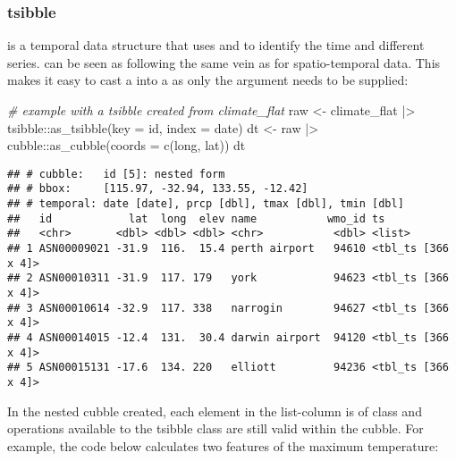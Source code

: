 \documentclass{article}
\newenvironment{Shaded}{\begin{snugshade}}{\end{snugshade}}
\newcommand{\AttributeTok}[1]{\textcolor[rgb]{0.77,0.63,0.00}{#1}}
\newcommand{\CommentTok}[1]{\textcolor[rgb]{0.56,0.35,0.01}{\textit{#1}}}
\newcommand{\FunctionTok}[1]{\textcolor[rgb]{0.00,0.00,0.00}{#1}}
\newcommand{\NormalTok}[1]{#1}
\newcommand{\OtherTok}[1]{\textcolor[rgb]{0.56,0.35,0.01}{#1}}
\newcommand{\SpecialCharTok}[1]{\textcolor[rgb]{0.00,0.00,0.00}{#1}}
\begin{document}
\hypertarget{tsibble}{%
\subsubsection{tsibble}\label{tsibble}}

 is a temporal data structure that uses  and  to identify the time and different series.  can be seen as following the same vein as  for spatio-temporal data. This makes it easy to cast a  into a  as only the  argument needs to be supplied:

\begin{Shaded}
\begin{Highlighting}[]
\CommentTok{\# example with a tsibble created from climate\_flat}
\NormalTok{raw }\OtherTok{\textless{}{-}}\NormalTok{ climate\_flat }\SpecialCharTok{|\textgreater{}}\NormalTok{ tsibble}\SpecialCharTok{::}\FunctionTok{as\_tsibble}\NormalTok{(}\AttributeTok{key =}\NormalTok{ id, }\AttributeTok{index =}\NormalTok{ date)}
\NormalTok{dt }\OtherTok{\textless{}{-}}\NormalTok{  raw }\SpecialCharTok{|\textgreater{}}\NormalTok{ cubble}\SpecialCharTok{::}\FunctionTok{as\_cubble}\NormalTok{(}\AttributeTok{coords =} \FunctionTok{c}\NormalTok{(long, lat))}
\NormalTok{dt}
\end{Highlighting}
\end{Shaded}

\begin{verbatim}
## # cubble:   id [5]: nested form
## # bbox:     [115.97, -32.94, 133.55, -12.42]
## # temporal: date [date], prcp [dbl], tmax [dbl], tmin [dbl]
##   id            lat  long  elev name           wmo_id ts                
##   <chr>       <dbl> <dbl> <dbl> <chr>           <dbl> <list>            
## 1 ASN00009021 -31.9  116.  15.4 perth airport   94610 <tbl_ts [366 x 4]>
## 2 ASN00010311 -31.9  117. 179   york            94623 <tbl_ts [366 x 4]>
## 3 ASN00010614 -32.9  117. 338   narrogin        94627 <tbl_ts [366 x 4]>
## 4 ASN00014015 -12.4  131.  30.4 darwin airport  94120 <tbl_ts [366 x 4]>
## 5 ASN00015131 -17.6  134. 220   elliott         94236 <tbl_ts [366 x 4]>
\end{verbatim}

In the nested cubble created, each element in the list-column  is of  class and operations available to the tsibble class are still valid within the cubble. For example, the code below calculates two features of the maximum temperature:
\end{document}
